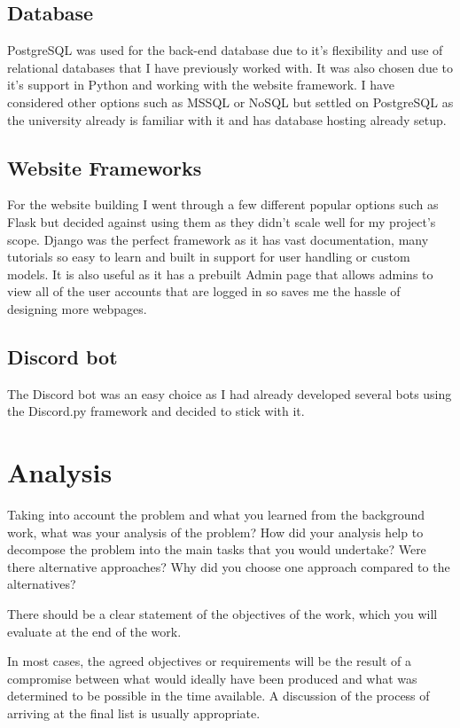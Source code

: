 \subsection{Database}
PostgreSQL \cite{psql} was used for the back-end database due to it's flexibility and use of  relational databases that I have previously worked with. It was also chosen due to it's support in Python and working with the website framework. I have considered other options such as MSSQL or NoSQL but settled on PostgreSQL as the university already is familiar with it and has database hosting already setup.

\subsection{Website Frameworks}
For the website building I went through a few different popular options such as Flask but decided against using them as they didn't scale well for my project's scope. Django \cite{Django} was the perfect framework as it has vast documentation, many tutorials so easy to learn and built in support for user handling or custom models. It is also useful as it has a prebuilt Admin page that allows admins to view all of the user accounts that are logged in so saves me the hassle of designing more webpages.

\subsection{Discord bot}
The Discord bot was an easy choice as I had already developed several bots using the Discord.py \cite{discord.py} framework and decided to stick with it.

\section{Analysis}
Taking into account the problem and what you learned from the background work, what was your analysis of the problem? How did your analysis help to decompose the problem into the main tasks that you would undertake? Were there alternative approaches? Why did you choose one approach compared to the alternatives? 

There should be a clear statement of the objectives of the work, which you will evaluate at the end of the work. 

In most cases, the agreed objectives or requirements will be the result of a compromise between what would ideally have been produced and what was determined to be possible in the time available. A discussion of the process of arriving at the final list is usually appropriate.

